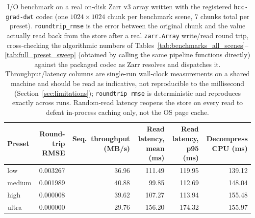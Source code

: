 \begin{table}[t]
\centering
\caption{I/O benchmark on a real on-disk Zarr v3 array written with the registered \texttt{hcc-grad-dwt} codec (one $1024\times1024$ chunk per benchmark scene, 7 chunks total per preset). \texttt{roundtrip\_rmse} is the error between the original chunk and the value actually read back from the store after a real \texttt{zarr.Array} write/read round trip, cross-checking the algorithmic numbers of Tables~\ref{tab:benchmarks_all_scenes}--\ref{tab:full_preset_sweep} (obtained by calling the same pipeline functions directly) against the packaged codec as Zarr resolves and dispatches it. Throughput/latency columns are single-run wall-clock measurements on a shared machine and should be read as indicative, not reproducible to the millisecond (Section~\ref{sec:limitations}); \texttt{roundtrip\_rmse} is deterministic and reproduces exactly across runs. Random-read latency reopens the store on every read to defeat in-process caching only, not the OS page cache.}
\label{tab:io_benchmark}
\begin{tabular}{@{}lrrrrr@{}}
\toprule
Preset & Round-trip RMSE & Seq.\ throughput (MB/s) & Read latency, mean (ms) & Read latency, p95 (ms) & Decompress CPU (ms) \\
\midrule
low    & 0.003267 & 36.96 & 111.49 & 119.95 & 139.12 \\
medium & 0.001989 & 40.88 & 99.85  & 112.69 & 148.04 \\
high   & 0.000008 & 39.62 & 107.27 & 113.94 & 155.48 \\
ultra  & 0.000000 & 29.76 & 156.20 & 174.32 & 155.97 \\
\bottomrule
\end{tabular}
\end{table}
